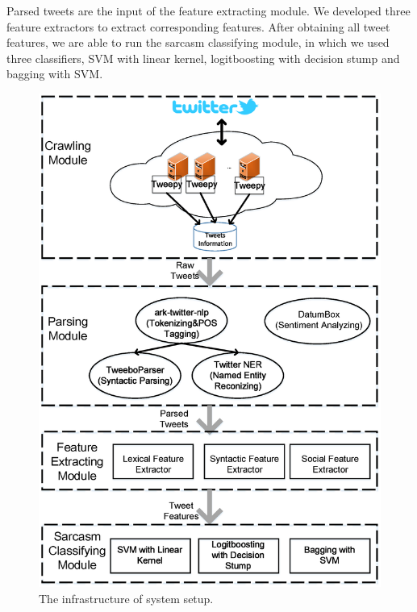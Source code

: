 Parsed tweets are the input of the feature extracting module. We developed three feature extractors to extract corresponding features. After obtaining all tweet features, we are able to run the sarcasm classifying module, in which we used three classifiers, SVM with linear kernel, logitboosting with decision stump and bagging with SVM. 

\begin{figure}[htpb]
\centering
\includegraphics[scale=0.3]{infrastructure.eps}
\caption{The infrastructure of system setup.}
\label{fig:infrastructure}
\end{figure}
